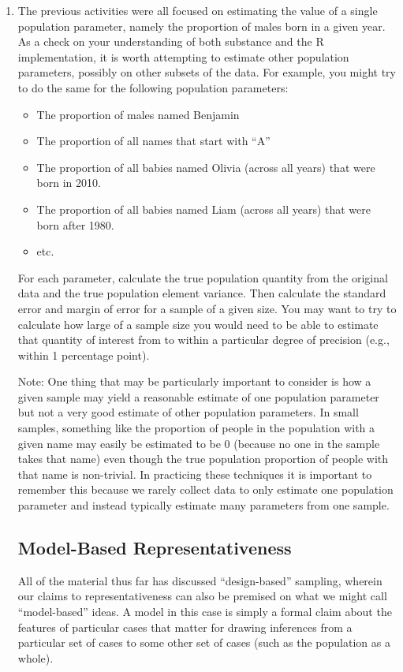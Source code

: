 \documentclass[a4paper,12pt]{article}
\begin{document}
\begin{enumerate}
\item The previous activities were all focused on estimating the value of a single population parameter, namely the proportion of males born in a given year. As a check on your understanding of both substance and the R implementation, it is worth attempting to estimate other population parameters, possibly on other subsets of the data. For example, you might try to do the same for the following population parameters:

\begin{itemize}
\item The proportion of males named Benjamin
\item The proportion of all names that start with ``A''
\item The proportion of all babies named Olivia (across all years) that were born in 2010.
\item The proportion of all babies named Liam (across all years) that were born after 1980.
\item etc.
\end{itemize}

\noindent For each parameter, calculate the true population quantity from the original data and the true population element variance. Then calculate the standard error and margin of error for a sample of a given size. You may want to try to calculate how large of a sample size you would need to be able to estimate that quantity of interest from to within a particular degree of precision (e.g., within 1 percentage point).

Note: One thing that may be particularly important to consider is how a given sample may yield a reasonable estimate of one population parameter but not a very good estimate of other population parameters. In small samples, something like the proportion of people in the population with a given name may easily be estimated to be 0 (because no one in the sample takes that name) even though the true population proportion of people with that name is non-trivial. In practicing these techniques it is important to remember this because we rarely collect data to only estimate one population parameter and instead typically estimate many parameters from one sample.


\subsection{Model-Based Representativeness}

All of the material thus far has discussed ``design-based'' sampling, wherein our claims to representativeness can also be premised on what we might call ``model-based'' ideas. A model in this case is simply a formal claim about the features of particular cases that matter for drawing inferences from a particular set of cases to some other set of cases (such as the population as a whole).


\end{enumerate}
\end{document}
